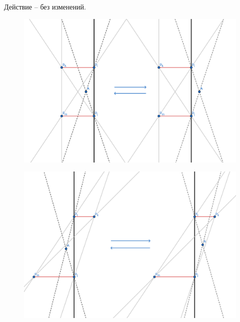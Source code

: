 \documentclass[letterpaper,12pt]{article}
\begin{document}
\begin{enumerate}
            Действие -- без изменений.
            \begin{figure}[H]
                  \centering
                  \includegraphics[width=.6\linewidth]{between_1.png}
            \end{figure}
            \begin{figure}[H]
                  \centering
                  \includegraphics[width=.6\linewidth]{between_2.png}
            \end{figure}
\end{enumerate}
\end{document}
